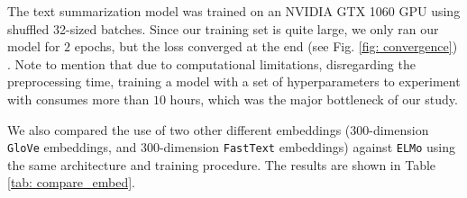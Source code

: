 The text summarization model was trained on an NVIDIA GTX 1060 GPU using shuffled 32-sized batches. Since our training set is quite large, we only ran our model for $2$ epochs, but the loss converged at the end (see Fig. \ref{fig: convergence}) . Note to mention that due to computational limitations, disregarding the preprocessing time, training a model with a set of hyperparameters to experiment with consumes more than $10$ hours, which was the major bottleneck of our study. 

We also compared the use of two other different embeddings ($300$-dimension \texttt{GloVe} embeddings, and $300$-dimension \texttt{FastText} embeddings) against \texttt{ELMo} using the same architecture and training procedure. The results are shown in Table \ref{tab: compare_embed}.




